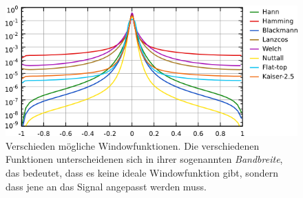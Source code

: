 \begin{figure}
\includegraphics[width=17cm]{pics/windowing-fft}
\caption{Verschieden mögliche Windowfunktionen\cite{gwyddion}.
Die verschiedenen Funktionen unterscheidenen sich in ihrer
sogenannten \textit{Bandbreite}, das bedeutet, dass es keine
ideale Windowfunktion gibt, sondern dass jene an das Signal
angepasst werden muss. } 
\label{fig:windowing-fft}
\end{figure}

